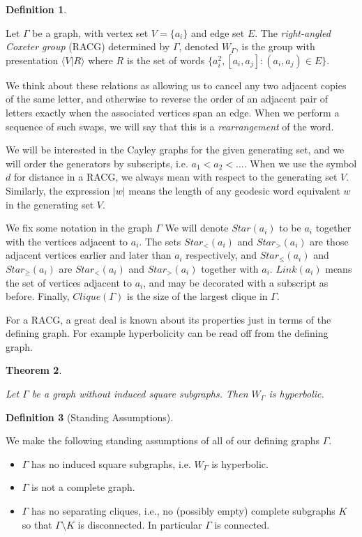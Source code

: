 \documentclass[10pt,a4paper]{amsart}
\newtheorem{theorem}{Theorem}[subsection]
\theoremstyle{definition}
\newtheorem{definition}[theorem]{Definition}
\theoremstyle{remark}
\begin{document}
	\begin{definition} \label{RACGDef}
		
		Let $\Gamma$ be a graph, with vertex set $V=\{a_i\}$ and edge set $E$. The \textit{right-angled Coxeter group} (RACG) determined by $\Gamma$, denoted $W_\Gamma$, is the group with presentation $\langle V| R\rangle$ where $R$ is the set of words $\{a_i^2, [a_i,a_j]: (a_i,a_j)\in E\}$.
		
	\end{definition}
	
	We think about these relations as allowing us to cancel any two adjacent copies of the same letter, and otherwise to reverse the order of an adjacent pair of letters exactly when the associated vertices span an edge. When we perform a sequence of such swaps, we will say that this is a \textit{rearrangement} of the word.
	
	We will be interested in the Cayley graphs for the given generating set, and we will order the generators by subscripts, i.e. $a_1<a_2<...$. When we use the symbol $d$ for distance in a RACG, we always mean with respect to the generating set $V$. Similarly, the expression $|w|$ means the length of any geodesic word equivalent $w$ in the generating set $V$.
	
	We fix some notation in the graph $\Gamma$ We will denote $Star(a_i)$ to be $a_i$ together with the vertices adjacent to $a_i$. The sets $Star_<(a_i)$ and $Star_>(a_i)$ are those adjacent vertices earlier and later than $a_i$ respectively, and $Star_\le(a_i)$ and $Star_\ge(a_i)$ are $Star_<(a_i)$ and $Star_>(a_i)$ together with $a_i$. $Link(a_i)$ means the set of vertices adjacent to $a_i$, and may be decorated with a subscript as before. Finally, $Clique(\Gamma)$ is the size of the largest clique in $\Gamma$.
	
	For a RACG, a great deal is known about its properties just in terms of the defining graph. For example hyperbolicity can be read off from the defining graph.
	
	\begin{theorem} \cite{Moussong}
		
		Let $\Gamma$ be a graph without induced square subgraphs. Then $W_\Gamma$ is hyperbolic.
		
	\end{theorem}
	
	
	
	\begin{definition}[Standing Assumptions] \label{StandingAssumptions}
		
		We make the following standing assumptions of all of our defining graphs $\Gamma$.		
		\begin{itemize}
			\item $\Gamma$ has no induced square subgraphs, i.e. $W_\Gamma$ is hyperbolic.
			\item $\Gamma$ is not a complete graph.
			\item $\Gamma$ has no separating cliques, i.e., no (possibly empty) complete subgraphs $K$ so that $\Gamma\setminus K$ is disconnected. In particular $\Gamma$ is connected.
		\end{itemize}	
	\end{definition}
	
\end{document}
